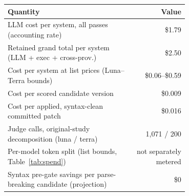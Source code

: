 \begin{tabular}{@{}p{0.70\linewidth}r@{}}
\toprule
Quantity & Value \\
\midrule
LLM cost per system, all passes (accounting rate) & \$1.79 \\
Retained grand total per system (LLM + exec + cross-prov.) & \$2.50 \\
Cost per system at list prices (Luna--Terra bounds) & \$0.06--\$0.59 \\
Cost per scored candidate version & \$0.009 \\
Cost per applied, syntax-clean committed patch & \$0.016 \\
Judge calls, original-study decomposition (luna / terra) & 1,071 / 200 \\
Per-model token split (list bounds, Table~\ref{tab:spend}) & not separately metered \\
Syntax pre-gate savings per parse-breaking candidate (projection) & \$0 \\
\bottomrule
\end{tabular}
